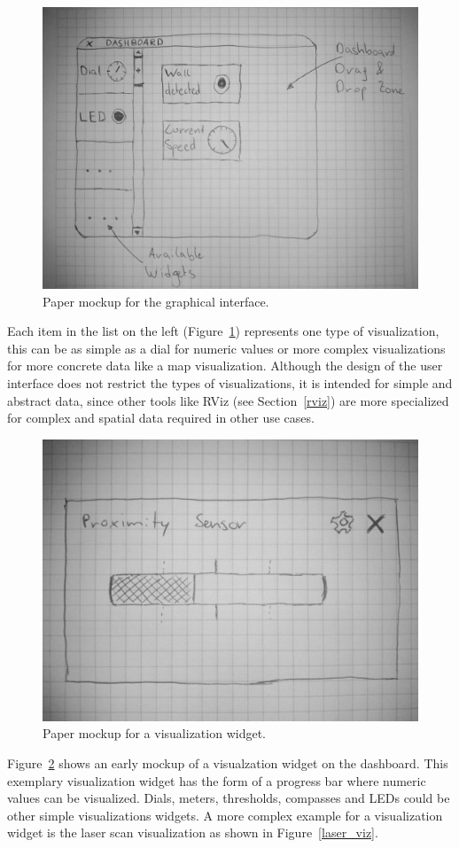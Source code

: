 \begin{figure}[htbp]
  \centering
  \includegraphics[width=\textwidth]{img/initial_gui_mockup.jpg}
  \caption{Paper mockup for the graphical interface.}
  \label{gui_mockup}
\end{figure}

Each item in the list on the left (Figure~\ref{gui_mockup}) represents one type of visualization, this can be as simple as a dial for numeric values or more complex visualizations for more concrete data like a map visualization. Although the design of the user interface does not restrict the types of visualizations, it is intended for simple and abstract data, since other tools like RViz (see Section~\ref{rviz}) are more specialized for complex and spatial data required in other use cases.

\begin{figure}[htbp]
  \centering
  \includegraphics[width=.5\textwidth]{img/initial_widget_mockup.jpg}
  \caption{Paper mockup for a visualization widget.}
  \label{widget_mockup}
\end{figure}

Figure~\ref{widget_mockup} shows an early mockup of a visualzation widget on the dashboard. This exemplary visualization widget has the form of a progress bar where numeric values can be visualized. Dials, meters, thresholds, compasses and LEDs could be other simple visualizations widgets. A more complex example for a visualization widget is the laser scan visualization as shown in Figure~\ref{laser_viz}.

